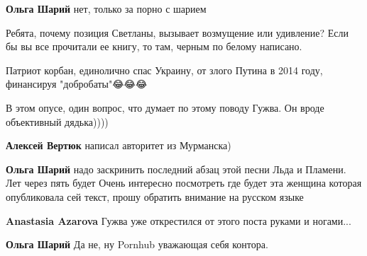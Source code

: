 \begin{itemize}
\begin{itemize}
\textbf{Ольга Шарий} нет, только за порно с шарием

 

Ребята, почему позиция Светланы, вызывает возмущение или удивление? Если бы вы
все прочитали ее книгу, то там, черным по белому написано.

Патриот корбан, единолично спас Украину, от злого Путина в 2014 году,
финансируя "добробаты"😂😂😂

В этом опусе, один вопрос, что думает по этому поводу Гужва. Он вроде
объективный дядька))))

 
\textbf{Алексей Вертюк} написал авторитет из Мурманска)

 
\textbf{Ольга Шарий} надо заскринить последний абзац этой песни Льда и Пламени. Лет через пять будет Очень интересно посмотреть где будет эта женщина которая опубликовала сей текст, прошу обратить внимание на русском языке

 
\textbf{Anastasia Azarova} Гужва уже открестился от этого поста руками и ногами...

 
\textbf{Ольга Шарий} Да не, ну Pornhub уважающая себя контора.

 

\end{itemize}
\end{itemize}
